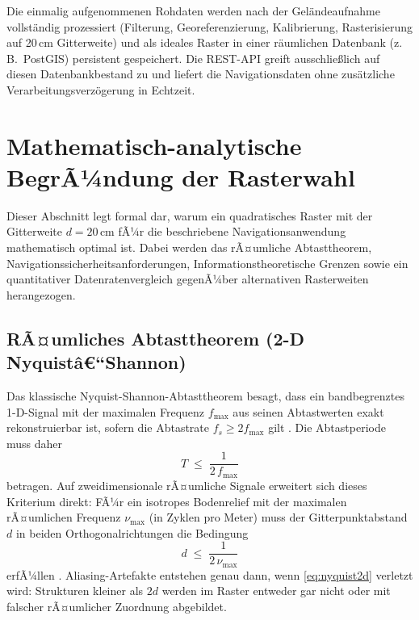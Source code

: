 ﻿\documentclass[a4paper,12pt]{article}
\theoremstyle{definition}
\begin{document}
\noindent
Die einmalig aufgenommenen Rohdaten werden nach der Gel\"{a}ndeaufnahme vollst\"{a}ndig
prozessiert (Filterung, Georeferenzierung, Kalibrierung, Rasterisierung auf 20\,cm
Gitterweite) und als ideales Raster in einer r\"{a}umlichen Datenbank (z.\,B.\ PostGIS)
persistent gespeichert. Die REST-API greift ausschlie\ss{}lich auf diesen Datenbankbestand
zu und liefert die Navigationsdaten ohne zus\"{a}tzliche Verarbeitungsverz\"{o}gerung in Echtzeit.

\section{Mathematisch-analytische BegrÃ¼ndung der Rasterwahl}

Dieser Abschnitt legt formal dar, warum ein quadratisches Raster mit der Gitterweite
$d = 20\,\text{cm}$ fÃ¼r die beschriebene Navigationsanwendung mathematisch optimal ist.
Dabei werden das rÃ¤umliche Abtasttheorem, Navigationssicherheitsanforderungen,
Informationstheoretische Grenzen sowie ein quantitativer Datenratenvergleich gegenÃ¼ber
alternativen Rasterweiten herangezogen.

\subsection{RÃ¤umliches Abtasttheorem (2-D Nyquistâ€“Shannon)}

Das klassische Nyquist-Shannon-Abtasttheorem besagt, dass ein bandbegrenztes
1-D-Signal mit der maximalen Frequenz $f_{\max}$ aus seinen Abtastwerten
exakt rekonstruierbar ist, sofern die Abtastrate $f_s \geq 2 f_{\max}$ gilt
\cite{shannon1949, nyquist1928}.
Die Abtastperiode muss daher
\begin{equation}
  T \;\leq\; \frac{1}{2\,f_{\max}}
  \label{eq:nyquist1d}
\end{equation}
betragen. Auf zweidimensionale rÃ¤umliche Signale erweitert sich dieses Kriterium
direkt: FÃ¼r ein isotropes Bodenrelief mit der maximalen rÃ¤umlichen Frequenz
$\nu_{\max}$ (in Zyklen pro Meter) muss der Gitterpunktabstand $d$ in beiden
Orthogonalrichtungen die Bedingung
\begin{equation}
  d \;\leq\; \frac{1}{2\,\nu_{\max}}
  \label{eq:nyquist2d}
\end{equation}
erfÃ¼llen \cite{oppenheim1996, marks2009}. Aliasing-Artefakte entstehen
genau dann, wenn \eqref{eq:nyquist2d} verletzt wird: Strukturen kleiner als
$2d$ werden im Raster entweder gar nicht oder mit falscher rÃ¤umlicher
Zuordnung abgebildet.
\end{document}
